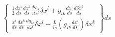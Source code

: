 \documentclass[a4paper]{article}
\begin{document}
\begin{equation}
\left\{
\begin{aligned}
\frac{1}{2}\frac{dx^i}{ds}\frac{dx^k}{ds}\frac{dg_{ik}}{dx^l}
\delta x^l + g_{ik}\frac{dx^i}{ds}\frac{d\delta x^k}{ds}\\
\frac{x^i}{ds}\frac{dx^k}{ds}\frac{dg_{ik}}{dx^l}
\delta x^l - \frac{L}{is}(g_{ik}\frac{dx^i}{ds})\delta x^k
\end{aligned}
\right\}
\label{f}
ds
\end{equation}
\end{document}
